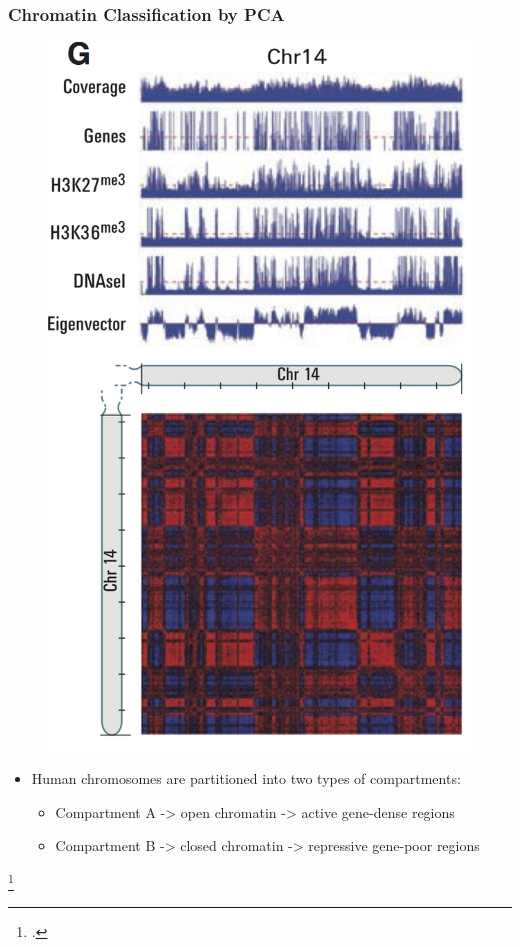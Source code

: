 \documentclass[12pt]{beamer}
\begin{document}
\begin{frame}
\frametitle{Chromatin Classification by PCA}

\begin{figure}
\includegraphics[scale=0.46]{eigen.png}
\end{figure}

\begin{itemize}
\item Human chromosomes are partitioned into two types of
  compartments:
\begin{itemize}
\item Compartment A -> open chromatin -> active gene-dense regions 
\vspace{0.07cm}
\item Compartment B -> closed chromatin -> repressive gene-poor regions
\end{itemize}
\end{itemize}

\footcitetext{aiden}

\end{frame}
\end{document}
